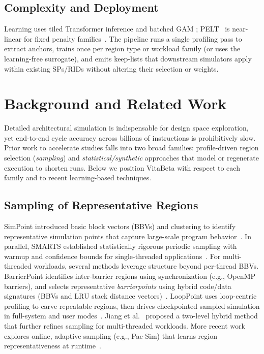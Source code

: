 \documentclass[conference]{IEEEtran}
\newcommand{\gam}{\textsc{GAM} }
\newcommand{\pelt}{\textsc{PELT} }
\begin{document}
\subsection{Complexity and Deployment}
Learning uses tiled Transformer inference and batched \gam; \pelt\ is near-linear for fixed penalty families~\cite{pelt12,ruptures20}. The pipeline runs a single profiling pass to extract anchors, trains once per region type or workload family (or uses the learning-free surrogate), and emits keep-lists that downstream simulators apply within existing SPs/RIDs without altering their selection or weights.

  
 

\section{Background and Related Work}\label{background}

Detailed architectural simulation is indispensable for design space exploration, yet end-to-end cycle accuracy across billions of instructions is prohibitively slow. Prior work to accelerate studies falls into two broad families: profile-driven region selection (\emph{sampling}) and \emph{statistical/synthetic} approaches that model or regenerate execution to shorten runs.  Below we position VitaBeta with respect to each family and to recent learning-based techniques. 

\subsection{Sampling of Representative Regions}
SimPoint introduced basic block vectors (BBVs) and clustering to identify representative simulation points that capture large-scale program behavior~\cite{simpoint-asplos02,hamerly-per04,hamerly-jmlr06}. In parallel, SMARTS established statistically rigorous periodic sampling with warmup and confidence bounds for single-threaded applications~\cite{smarts-isca03}. For multi-threaded workloads, several methods leverage structure beyond per-thread BBVs. BarrierPoint identifies inter-barrier regions using synchronization (e.g., OpenMP barriers), and selects representative \emph{barrierpoints} using hybrid code/data signatures (BBVs and LRU stack distance vectors)~\cite{barrierpoint-ispass14}. LoopPoint uses loop-centric profiling to carve repeatable regions, then drives checkpointed sampled simulation in full-system and user modes~\cite{looppoint-hpca22}. Jiang et al.~\cite{jiang2015_taco} proposed a two-level hybrid method that further refines sampling for multi-threaded workloads. More recent work explores online, adaptive sampling (e.g., Pac-Sim) that learns region representativeness at runtime~\cite{pacsimm-taco24}. 
 
\end{document}
